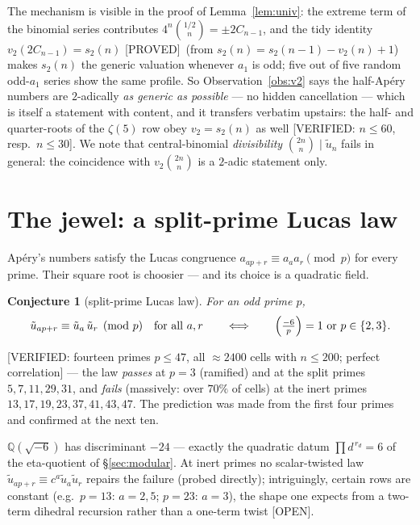 \documentclass[11pt,reqno]{amsart}
\theoremstyle{plain}
\newtheorem{conjecture}[theorem]{Conjecture}
\theoremstyle{definition}
\theoremstyle{remark}
\newcommand{\Q}{\mathbb{Q}}
\newcommand{\bin}[2]{\binom{#1}{#2}}
\newcommand{\ut}{\tilde u}
\newcommand{\Proved}{\textup{\textsf{[PROVED]}}}
\newcommand{\VerifiedR}[1]{\textup{\textsf{[VERIFIED: #1]}}}
\newcommand{\Open}{\textup{\textsf{[OPEN]}}}
\begin{document}
The mechanism is visible in the proof of Lemma~\ref{lem:univ}: the extreme
term of the binomial series contributes $4^n\bin{1/2}n=\pm2C_{n-1}$, and
the tidy identity $v_2(2C_{n-1})=s_2(n)$ \Proved\ (from
$s_2(n)=s_2(n-1)-v_2(n)+1$) makes $s_2(n)$ the generic valuation whenever
$a_1$ is odd; five out of five random odd-$a_1$ series show the same
profile. So Observation~\ref{obs:v2} says the half-Ap\'ery numbers are
$2$-adically \emph{as generic as possible} --- no hidden cancellation ---
which is itself a statement with content, and it transfers verbatim
upstairs: the half- and quarter-roots of the $\zeta(5)$ row obey
$v_2=s_2(n)$ as well \VerifiedR{$n\le60$, resp.\ $n\le30$}. We note that
central-binomial \emph{divisibility} $\bin{2n}n\mid\ut_n$ fails in general:
the coincidence with $v_2\bin{2n}n$ is a $2$-adic statement only.

\section{The jewel: a split-prime Lucas law}\label{sec:lucas}

Ap\'ery's numbers satisfy the Lucas congruence
$a_{ap+r}\equiv a_aa_r\pmod p$ for every prime. Their square root is
choosier --- and its choice is a quadratic field.

\begin{conjecture}[split-prime Lucas law]\label{conj:lucas}
For an odd prime $p$,
\[
\ut_{ap+r}\equiv\ut_a\,\ut_r\pmod p\quad\text{for all }a,r
\qquad\Longleftrightarrow\qquad
\Bigl(\tfrac{-6}{p}\Bigr)=1\ \text{or}\ p\in\{2,3\}.
\]
\end{conjecture}

\VerifiedR{fourteen primes $p\le47$, all $\approx2400$ cells with
$n\le200$; perfect correlation} --- the law \emph{passes} at
$p=3$ (ramified) and at the split primes $5,7,11,29,31$, and \emph{fails}
(massively: over $70\%$ of cells) at the inert primes
$13,17,19,23,37,41,43,47$. The prediction was made from the first four
primes and confirmed at the next ten.

$\Q(\sqrt{-6})$ has discriminant $-24$ --- exactly the quadratic datum
$\prod d^{\,r_d}=6$ of the eta-quotient of \S\ref{sec:modular}. At inert
primes no scalar-twisted law
$\ut_{ap+r}\equiv c^a\ut_a\ut_r$ repairs the failure (probed directly);
intriguingly, certain rows are constant (e.g.\ $p=13$: $a=2,5$; $p=23$:
$a=3$), the shape one expects from a two-term dihedral recursion rather
than a one-term twist \Open.
\end{document}
